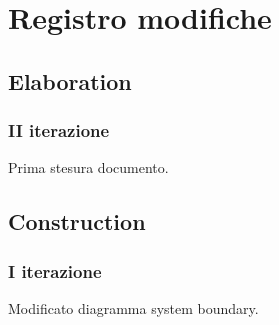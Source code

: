 \documentclass[10pt]{softeng} %
\begin{document}
\startofdocument{}









\clearpage

\section{Registro modifiche}

\subsection{Elaboration}

\subsubsection{II iterazione}

Prima stesura documento.

\subsection{Construction}

\subsubsection{I iterazione}

Modificato diagramma system boundary.


\printcustombib{}

\end{document}
